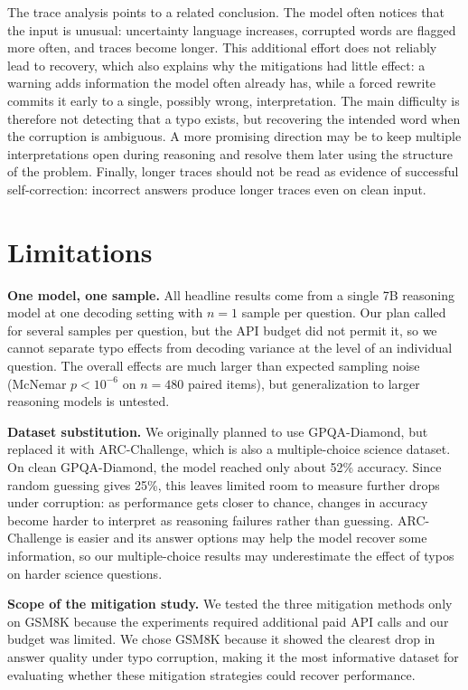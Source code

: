 \documentclass[11pt]{article}
\begin{document}
The trace analysis points to a related conclusion. The model often notices that
the input is unusual: uncertainty language increases, corrupted words are
flagged more often, and traces become longer. This additional effort does not
reliably lead to recovery, which also explains why the mitigations had little
effect: a warning adds information the model often already has, while a forced
rewrite commits it early to a single, possibly wrong, interpretation. The main
difficulty is therefore not detecting that a typo exists, but recovering the
intended word when the corruption is ambiguous. A more promising direction may
be to keep multiple interpretations open during reasoning and resolve them
later using the structure of the problem. Finally, longer traces should not be
read as evidence of successful self-correction: incorrect answers produce
longer traces even on clean input.

\section{Limitations}

\textbf{One model, one sample.}
All headline results come from a single 7B reasoning model at one decoding
setting with $n{=}1$ sample per question. Our plan called for several samples per
question, but the API budget did not permit it, so we cannot separate typo
effects from decoding variance at the level of an individual question. The
overall effects are much larger than expected sampling noise (McNemar
$p < 10^{-6}$ on $n{=}480$ paired items), but generalization to larger reasoning
models is untested.

\textbf{Dataset substitution.}
We originally planned to use GPQA-Diamond, but replaced it with ARC-Challenge,
which is also a multiple-choice science dataset. On clean GPQA-Diamond, the
model reached only about 52\% accuracy. Since random guessing gives 25\%, this
leaves limited room to measure further drops under corruption: as performance
gets closer to chance, changes in accuracy become harder to interpret as
reasoning failures rather than guessing. ARC-Challenge is easier and its answer
options may help the model recover some information, so our multiple-choice
results may underestimate the effect of typos on harder science questions.

\textbf{Scope of the mitigation study.}
We tested the three mitigation methods only on GSM8K because the experiments
required additional paid API calls and our budget was limited. We chose GSM8K
because it showed the clearest drop in answer quality under typo corruption,
making it the most informative dataset for evaluating whether these mitigation
strategies could recover performance.
\end{document}
